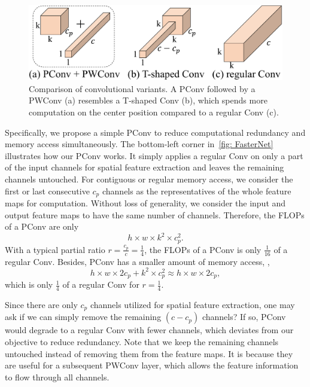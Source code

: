 \begin{figure}
    \centering
    \includegraphics[width=.92\linewidth]{figures/pconv_pwconv-cropped.pdf}
    \vspace{-0.1in}
    \caption{Comparison of convolutional variants. A PConv followed by a PWConv (a) resembles a 
    T-shaped
     Conv (b), which spends more computation on the center position compared to a regular Conv (c).}
    \label{fig: pconv_pwconv}
    \vspace{-0.1in}
\end{figure}

Specifically, we propose a simple PConv to reduce computational redundancy and memory access simultaneously. The bottom-left corner in~\cref{fig: FasterNet} illustrates how our PConv works. It simply applies a regular Conv on only a part of the input channels for spatial feature extraction and leaves the remaining channels untouched. For contiguous or regular memory access, we consider the first or last consecutive $c_p$
channels as the representatives of the whole feature maps for computation. Without loss of generality, we consider the input and output feature maps to have the same number of channels. Therefore, the FLOPs of a PConv are only 
\begin{equation}
   h \times w \times k^2 \times c_p^2.
  \label{eq:FLOPs_PConv}
\end{equation}
With a typical partial ratio $r \!=\! \frac{c_p}{c} \!=\! \frac{1}{4}$,
the FLOPs of a PConv is only $\frac{1}{16}$
of a regular Conv. Besides, PConv has a smaller amount of memory access, \ie,
\begin{equation}
  h \times w \times 2c_p + k^2 \times c_p^2 \approx h \times w \times 2c_p,
  \label{eq:memory_access_PConv}
\end{equation}
which is only 
$\frac{1}{4}$
of a regular Conv for 
$r=\frac{1}{4}$. 

Since there are only $c_p$
channels utilized for spatial feature extraction, one may ask if we can simply remove the remaining $(c-c_p)$
channels? If so, PConv would degrade to a regular Conv with fewer channels, which deviates from our objective to reduce redundancy. Note that we keep the remaining channels untouched instead of removing them from the feature maps. It is because they are useful for a subsequent PWConv layer, which allows the feature information to flow through all channels.


